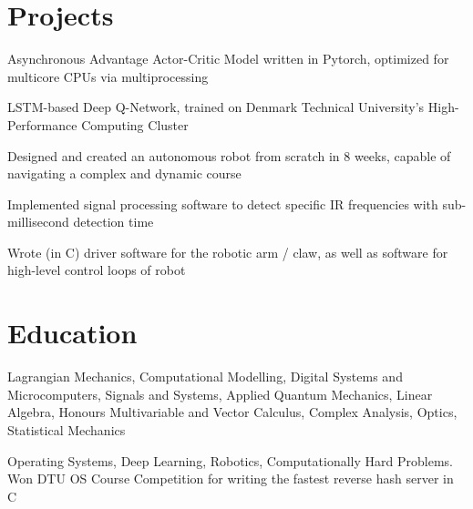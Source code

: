 \documentclass[]{deedy-resume-openfont}
\begin{document}
\section{Projects}

\begin{tightemize}
\item Asynchronous Advantage Actor-Critic Model written in Pytorch, optimized for multicore CPUs via multiprocessing
\item LSTM-based Deep Q-Network, trained on Denmark Technical University's High-Performance Computing Cluster
\end{tightemize}

\vspace{8pt}

\begin{tightemize}
\item Designed and created an autonomous robot from scratch in 8 weeks, capable of navigating a complex and dynamic course
\item Implemented signal processing software to detect specific IR frequencies with sub-millisecond detection time
\item Wrote (in C) driver software for the robotic arm / claw, as well as software for high-level control loops of robot
\end{tightemize}

\vspace{12pt}


\section{Education}

\begin{adjustwidth}{0.55cm}{1.25cm}
   Lagrangian Mechanics, Computational Modelling, Digital Systems and Microcomputers, Signals and Systems, Applied Quantum Mechanics, Linear Algebra, Honours Multivariable and Vector Calculus, Complex Analysis, Optics, Statistical Mechanics
\end{adjustwidth}

\vspace{8pt}

\begin{adjustwidth}{0.55cm}{1.25cm}
   Operating Systems, Deep Learning, Robotics, Computationally Hard Problems. \\
  Won DTU OS Course Competition for writing the fastest reverse hash server in C
\end{adjustwidth}

\vspace{10pt}
\end{document}
